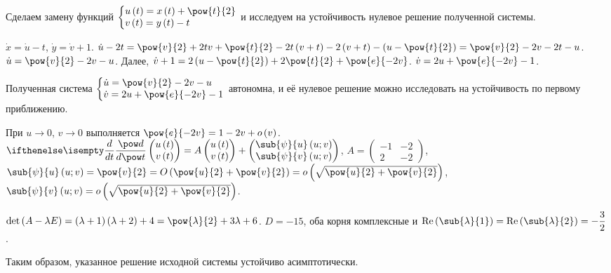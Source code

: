 \documentclass[a5paper,10pt]{article}
\begin{document}
Сделаем замену функций
$\tsys{u\br{t} = x\br{t} + \pow{t}{2} \\ v\br{t} = y\br{t} - t}$
и исследуем на устойчивость нулевое решение полученной системы.

$\dot{x} = \dot{u} - t$, $\dot{y} = \dot{v} + 1$.
$\dot{u} - 2t
    = \pow{v}{2} + 2tv + \pow{t}{2} - 2t\br{v + t} - 2\br{v + t} - \br{u - \pow{t}{2}}
    = \pow{v}{2} - 2v - 2t - u$.
$\dot{u} = \pow{v}{2} - 2v - u$.
Далее,
$\dot{v} + 1 = 2\br{u - \pow{t}{2}} + 2\pow{t}{2} + \pow{e}{-2v}$.
$\dot{v} = 2u + \pow{e}{-2v} - 1$.

Полученная система 
$\tsys{\dot{u} = \pow{v}{2} - 2v - u \\ \dot{v} = 2u + \pow{e}{-2v} - 1}$
автономна, и её нулевое решение можно исследовать на устойчивость по первому приближению.

При $u \to 0$, $v \to 0$ выполняется
$\pow{e}{-2v} = 1 - 2v + o\br{v}$.
$\der{}{t} \begin{pmatrix} u\br{t} \\ v\br{t} \end{pmatrix} 
    = A \begin{pmatrix} u\br{t} \\ v\br{t} \end{pmatrix} 
    + \begin{pmatrix} \sub{\psi}{u}\br{u; v} \\ \sub{\psi}{v}\br{u; v} \end{pmatrix}$,
$A = \begin{pmatrix} -1 & -2 \\ 2 & -2 \end{pmatrix}$,
$\sub{\psi}{u}\br{u; v} = \pow{v}{2} 
    = O\br{\pow{u}{2} + \pow{v}{2}} 
    = o\br{\sqrt{\pow{u}{2} + \pow{v}{2}}}$,
$\sub{\psi}{v}\br{u; v} = o\br{\sqrt{\pow{u}{2} + \pow{v}{2}}}$.

$\det\br{A - \lambda E} 
    = \br{\lambda + 1}\br{\lambda + 2} + 4 
    = \pow{\lambda}{2} + 3\lambda + 6$.
$D = -15$, оба корня комплексные и 
$\Re\br{\sub{\lambda}{1}} = \Re\br{\sub{\lambda}{2}} = -\dfrac {3} {2}$.

Таким образом, указанное решение исходной системы устойчиво асимптотически.
\end{document}
